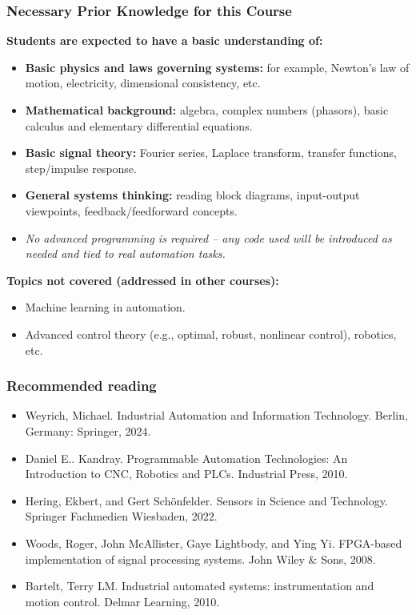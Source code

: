 \begin{frame}
	\frametitle{Necessary Prior Knowledge for this Course}
  \textbf{Students are expected to have a basic understanding of:}
  \begin{itemize}
    \item \textbf{Basic physics and laws governing systems:} for example, Newton's law of motion, electricity, dimensional consistency, etc.
    \item \textbf{Mathematical background:} algebra, complex numbers (phasors), basic calculus and elementary differential equations.
    \item \textbf{Basic signal theory:} Fourier series, Laplace transform, transfer functions, step/impulse response.
    \item \textbf{General systems thinking:} reading block diagrams, input-output viewpoints, feedback/feedforward concepts.
    \item \emph{No advanced programming is required -- any code used will be introduced as needed and tied to real automation tasks.}
  \end{itemize}

  \textbf{Topics not covered (addressed in other courses):}
  \begin{itemize}
    \item Machine learning in automation.
    \item Advanced control theory (e.g., optimal, robust, nonlinear control), robotics, etc.
  \end{itemize}
\end{frame}


\begin{frame}
	\frametitle{Recommended reading}
	\begin{itemize}
		\item Weyrich, Michael. Industrial Automation and Information Technology. Berlin, Germany: Springer, 2024.
		\item Daniel E.. Kandray. Programmable Automation Technologies: An Introduction to CNC, Robotics and PLCs. Industrial Press, 2010.
		\item Hering, Ekbert, and Gert Schönfelder. Sensors in Science and Technology. Springer Fachmedien Wiesbaden, 2022.
		\item Woods, Roger, John McAllister, Gaye Lightbody, and Ying Yi. FPGA-based implementation of signal processing systems. John Wiley \& Sons, 2008.
		\item Bartelt, Terry LM. Industrial automated systems: instrumentation and motion control. Delmar Learning, 2010.
	\end{itemize}
\end{frame}

